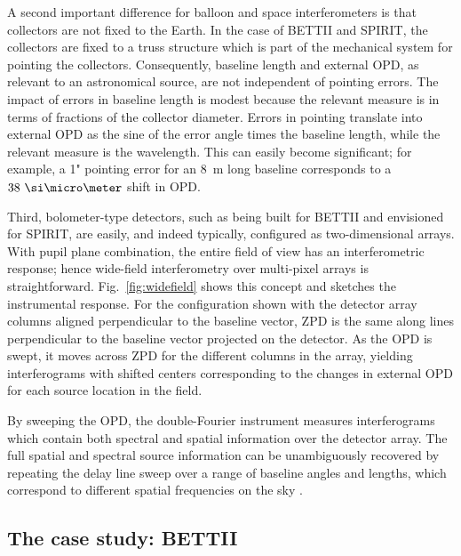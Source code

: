 
A second important difference for balloon and space interferometers is that collectors are not fixed
to the Earth. In the case of BETTII and SPIRIT, the collectors are fixed to a truss structure which
is part of the mechanical system for pointing the collectors. Consequently, baseline length
and external OPD, as relevant to an astronomical source, are not independent of pointing errors. The impact of errors in baseline length is modest because the relevant measure is in terms of fractions of the collector diameter. Errors in pointing translate into external OPD as the sine of the error angle times the baseline length, while the relevant measure is the wavelength. This can easily become significant;
for example, a 1" pointing error for an 8~m long baseline corresponds to a $38~\um$ shift in OPD.

Third, bolometer-type detectors, such as being built for BETTII and envisioned for SPIRIT, are
easily, and indeed typically, configured as two-dimensional arrays. With pupil plane combination,
the entire field of view has an interferometric response; hence wide-field interferometry over
multi-pixel arrays is straightforward. Fig.~\ref{fig:widefield} shows this concept and sketches the instrumental
response. For the configuration shown with the detector array columns aligned perpendicular
to the baseline vector, ZPD is the same along lines perpendicular to the baseline vector projected on the detector. As the OPD is swept, it moves across ZPD for the different columns in the array, yielding interferograms with shifted centers corresponding to the changes in external OPD for each source location in the field. 

By sweeping the OPD, the double-Fourier instrument measures interferograms which contain both spectral and spatial information over the detector array. The full spatial and spectral source information can be unambiguously recovered by repeating the delay line sweep over a range of baseline angles and lengths, which correspond to different spatial frequencies on the sky \citep{Mariotti:1988vea}.


\subsection{The case study: BETTII}

